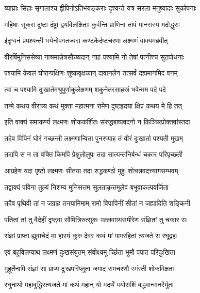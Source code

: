 \twolineshloka
{व्याघ्राः सिंहाः सृगालाश्च द्वीपिनोऽतिभयङ्कराः}
{दृश्यन्ते यत्र सरला मनुष्यादाः सुकोपनाः}%

\twolineshloka
{महिषाः सूकरा दुष्टा दंष्ट्रा द्वयविलक्षिताः}
{कुर्वन्ति प्राणिनां तापं मानसस्य मदोद्धुराः}%

\twolineshloka
{ईदृग्वनं प्रपश्यन्ती भयेनोपगतज्वरा}
{कण्टकैर्दष्टचरणा लक्ष्मणं वाक्यमब्रवीत्}%


\twolineshloka
{वीरर्षिमुनिसंसेव्या नाश्रमान्नेत्रसौख्यदान्}
{नाहं पश्यामि नो तेषां पत्नीश्च सुतपोधनाः}%

\twolineshloka
{पश्यामि केवलं घोरान्पक्षिणः शुष्कवृक्षकान्}
{दावानलेन तत्सर्वं दह्यमानमिदं वनम्}%

\twolineshloka
{त्वां च पश्यामि दुःखार्तमश्रुपूर्णाकुलेक्षणम्}
{शकुनेतरसाहस्रं भवेन्मम पदे पदे}%

\twolineshloka
{तन्मे कथय वीराग्र्य कथं मुक्ता महात्मना}
{रामेण दुष्टहृदया क्षिप्रं कथय मे हि तत्}%

\twolineshloka
{इति वाक्यं समाकर्ण्य लक्ष्मणः शोककर्शितः}
{संरुद्धबाष्पवदनो न किञ्चित्प्रोक्तवांस्तदा}%

\twolineshloka
{तदेव विपिनं घोरं गच्छन्ती लक्ष्मणान्विता}
{पुनरप्याह तं वीरं दुःखार्ता पश्यती मुखम्}%

\twolineshloka
{तदापि स न तां वक्ति किमपि प्रेक्षुलोलुपः}
{तदा सात्यन्तनिर्बन्धं चकार परिपृच्छती}%

\twolineshloka
{आग्रहेण यदा पृष्टो लक्ष्मणः सीतया तदा}
{रुद्धकण्ठो मुहुः शोचन्नवदत्त्यागसम्भवम्}%

\twolineshloka
{तद्वाक्यं पविना तुल्यं निशम्य मुनिसत्तम}
{सुलताकृत्तमूलेव बभूवाकल्पवर्जिता}%

\twolineshloka
{तदैव पृथिवी तां न जग्राह तनयामिमाम्}
{रामो विपापिनीं सीतां न जह्यादिति शङ्किनी}%

\twolineshloka
{पतितां तां तु वैदेहीं दृष्ट्वा सौमित्रिरुत्सुकः}
{पल्लवाग्र्यसमीरेण संज्ञितां तु चकार सः}%

\twolineshloka
{संज्ञां प्राप्ता ह्युवाचेदं मा हास्यं कुरु देवर}
{कथं मां पापरहितां त्यजते स रघूद्वहः}%

\twolineshloka
{एवं बहुविलप्याथ लक्ष्मणं दुःखसंयुतम्}
{संवीक्ष्यमू र्च्छिता भूमौ पपात परिदुःखिता}%

\twolineshloka
{मुहूर्तेनापि संज्ञां सा प्राप्य दुःखपरिप्लुता}
{जगाद रामचरणौ स्मंरती शोकविक्षता}%

\twolineshloka
{रघुनाथो महाबुद्धिस्त्यजते मां कथं महान्}
{यो मदर्थे पयोराशिं बद्धवान्वानरैर्युतः}%

